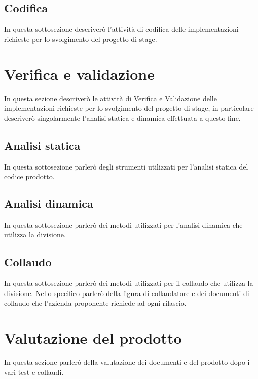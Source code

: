 \subsection{Codifica}
In questa sottosezione descriverò l'attività di codifica delle implementazioni richieste per lo svolgimento del progetto di stage.
	
\section{Verifica e validazione}
In questa sezione descriverò le attività di Verifica e Validazione delle implementazioni richieste per lo svolgimento del progetto di stage, in particolare descriverò singolarmente l'analisi statica e dinamica effettuata a questo fine.

\subsection{Analisi statica}
In questa sottosezione parlerò degli strumenti utilizzati per l'analisi statica del codice prodotto.
	
\subsection{Analisi dinamica}
In questa sottosezione parlerò dei metodi utilizzati per l'analisi dinamica che utilizza la divisione.

\subsection{Collaudo}
In questa sottosezione parlerò dei metodi utilizzati per il collaudo che utilizza la divisione. Nello specifico parlerò della figura di collaudatore e dei documenti di collaudo che l'azienda proponente richiede ad ogni rilascio.
	
\section{Valutazione del prodotto}
In questa sezione parlerò della valutazione dei documenti e del prodotto dopo i vari test e collaudi.